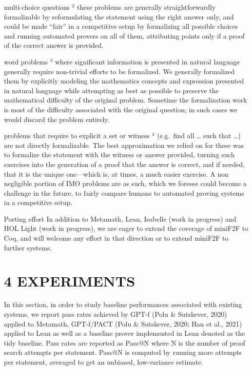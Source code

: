 \documentclass[
]{article}
\begin{document}
multi-choice questions \(^{2}\) these problems are generally
straightforwardly formalizable by reformulating the statement using the
right answer only, and could be made ``fair'' in a competitive setup by
formalizing all possible choices and running automated provers on all of
them, attributing points only if a proof of the correct answer is
provided.

word problems \(^{3}\) where significant information is presented in
natural language generally require non-trivial efforts to be formalized.
We generally formalized them by explicitly modeling the mathematics
concepts and expression presented in natural language while attempting
as best as possible to preserve the mathematical difficulty of the
original problem. Sometime the formalization work is most of the
difficulty associated with the original question; in such cases we would
discard the problem entirely.

problems that require to explicit a set or witness \(^{4}\) (e.g.~find
all \ldots{} such that \ldots) are not directly formalizable. The best
approximation we relied on for these was to formalize the statement with
the witness or answer provided, turning such exercises into the
generation of a proof that the answer is correct, and if needed, that it
is the unique one---which is, at times, a much easier exercise. A non
negligible portion of IMO problems are as such, which we foresee could
become a challenge in the future, to fairly compare humans to automated
proving systems in a competitive setup.

Porting effort In addition to Metamath, Lean, Isabelle (work in
progress) and HOL Light (work in progress), we are eager to extend the
coverage of miniF2F to Coq, and will welcome any effort in that
direction or to extend miniF2F to further systems.

\section{4 EXPERIMENTS}\label{experiments}

In this section, in order to study baseline performances associated with
existing systems, we report pass rates achieved by GPT-f (Polu \&
Sutskever, 2020) applied to Metamath, GPT-f/PACT (Polu \& Sutskever,
2020; Han et al., 2021) applied to Lean as well as a baseline prover
implemented in Lean denoted as the tidy baseline. Pass rates are
reported as Pass@N where N is the number of proof search attempts per
statement. Pass@N is computed by running more attempts per statement,
averaged to get an unbiased, low-variance estimate.
\end{document}
